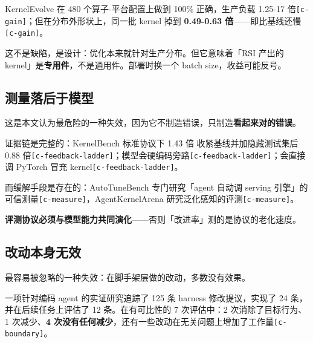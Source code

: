 KernelEvolve 在 480 个算子-平台配置上做到 100\% 正确，生产负载 1.25-\hspace{0pt}17 倍{\scriptsize\texttt{[c-\hspace{0pt}gain]}}；但在分布外形状上，同一批 kernel 掉到 \textbf{0.49-\hspace{0pt}0.63 倍}——即比基线还慢{\scriptsize\texttt{[c-\hspace{0pt}gain]}}。


这不是缺陷，是设计：优化本来就针对生产分布。但它意味着「RSI 产出的 kernel」是\textbf{专用件}，不是通用件。部署时换一个 batch size，收益可能反号。


\subsection{测量落后于模型}

这是本文认为最危险的一种失效，因为它不制造错误，只制造\textbf{看起来对的错误}。


证据链是完整的：KernelBench 标准协议下 1.43 倍  收紧基线并加隐藏测试集后 0.88 倍{\scriptsize\texttt{[c-\hspace{0pt}feedback-\hspace{0pt}ladder]}}；模型会硬编码旁路{\scriptsize\texttt{[c-\hspace{0pt}feedback-\hspace{0pt}ladder]}}；会直接调 PyTorch 冒充 kernel{\scriptsize\texttt{[c-\hspace{0pt}feedback-\hspace{0pt}ladder]}}。


而缓解手段是存在的：AutoTuneBench 专门研究「agent 自动调 serving 引擎」的可信测量{\scriptsize\texttt{[c-\hspace{0pt}measure]}}，AgentKernelArena 研究泛化感知的评测{\scriptsize\texttt{[c-\hspace{0pt}measure]}}。


\textbf{评测协议必须与模型能力共同演化}——否则「改进率」测的是协议的老化速度。


\subsection{改动本身无效}

最容易被忽略的一种失效：在脚手架层做的改动，多数没有效果。


一项针对编码 agent 的实证研究追踪了 125 条 harness 修改提议，实现了 24 条，并在后续任务上评估了 12 条。在有可比性的 7 次评估中：2 次消除了目标行为、1 次减少、\textbf{4 次没有任何减少}，还有一些改动在无关问题上增加了工作量{\scriptsize\texttt{[c-\hspace{0pt}boundary]}}。


